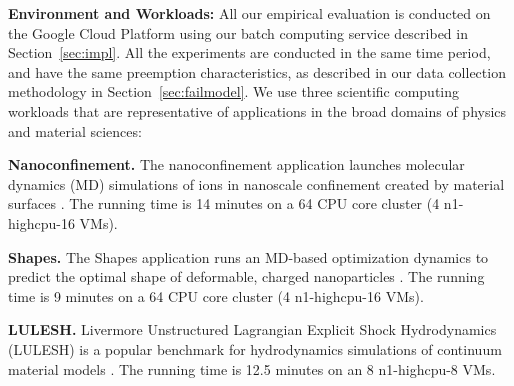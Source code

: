 \noindent \textbf{Environment and Workloads:}
All our empirical evaluation is conducted on the Google Cloud Platform using our batch computing service described in Section~\ref{sec:impl}. 
All the experiments are conducted in the same time period, and have the same preemption characteristics, as described in our data collection methodology in  Section~\ref{sec:failmodel}. 
%
We use three scientific computing workloads that are representative of  applications in the broad domains of physics and material sciences:%


\noindent \textbf{Nanoconfinement.}
The nanoconfinement application launches molecular dynamics (MD) simulations of ions in nanoscale confinement created by material surfaces \cite{jing2015ionic,kadupitiya2017}. The running time is 14 minutes on a 64 CPU core cluster (4 n1-highcpu-16 VMs). 

\noindent \textbf{Shapes.} The Shapes application runs an MD-based optimization dynamics to predict the optimal shape of deformable, charged nanoparticles \cite{jto1,brunk2019computational}. The running time is 9 minutes on a 64 CPU core cluster (4 n1-highcpu-16 VMs). 

\noindent \textbf{LULESH.} Livermore Unstructured Lagrangian Explicit Shock Hydrodynamics (LULESH)  is a popular benchmark for hydrodynamics simulations of continuum material models \cite{IPDPS13:LULESH,LULESH2:changes}. The running time is 12.5 minutes on an 8 n1-highcpu-8 VMs.





